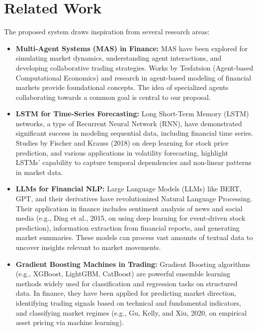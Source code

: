 \documentclass[11pt,a4paper]{article}
\begin{document}
\section{Related Work}

The proposed system draws inspiration from several research areas:

\begin{itemize}
\item   \textbf{Multi-Agent Systems (MAS) in Finance:} MAS have been explored for simulating market dynamics, understanding agent interactions, and developing collaborative trading strategies. Works by Tesfatsion (Agent-based Computational Economics) and research in agent-based modeling of financial markets provide foundational concepts. The idea of specialized agents collaborating towards a common goal is central to our proposal.

\item   \textbf{LSTM for Time-Series Forecasting:} Long Short-Term Memory (LSTM) networks, a type of Recurrent Neural Network (RNN), have demonstrated significant success in modeling sequential data, including financial time series. Studies by Fischer and Krauss (2018) on deep learning for stock price prediction, and various applications in volatility forecasting, highlight LSTMs' capability to capture temporal dependencies and non-linear patterns in market data.

\item   \textbf{LLMs for Financial NLP:} Large Language Models (LLMs) like BERT, GPT, and their derivatives have revolutionized Natural Language Processing. Their application in finance includes sentiment analysis of news and social media (e.g., Ding et al., 2015, on using deep learning for event-driven stock prediction), information extraction from financial reports, and generating market summaries. These models can process vast amounts of textual data to uncover insights relevant to market movements.

\item   \textbf{Gradient Boosting Machines in Trading:} Gradient Boosting algorithms (e.g., XGBoost, LightGBM, CatBoost) are powerful ensemble learning methods widely used for classification and regression tasks on structured data. In finance, they have been applied for predicting market direction, identifying trading signals based on technical and fundamental indicators, and classifying market regimes (e.g., Gu, Kelly, and Xiu, 2020, on empirical asset pricing via machine learning).


\end{itemize}
\end{document}
